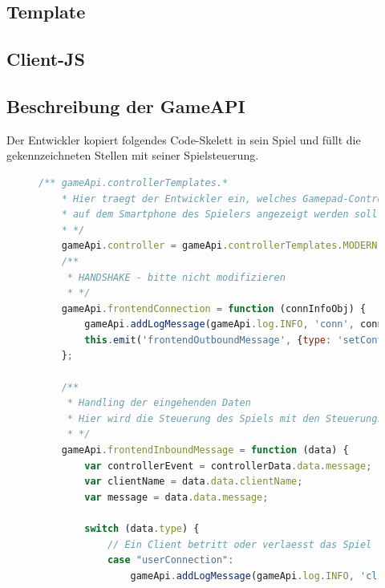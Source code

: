 \documentclass[a4paper]{spie}  %
\begin{document}
\subsection{Template} %
\subsection{Client-JS} %

\subsection{Beschreibung der GameAPI}
Der Entwickler kopiert folgendes Code-Skelett in sein Spiel und füllt die gekennzeichneten Stellen mit seiner Spielsteuerung.
\begin{figure}[h!]
	\centering
        \begin{lstlisting}[language=JavaScript,caption={Start der Applikation},label={lst:gameAPI}]
    /** gameApi.controllerTemplates.*
    * Hier traegt der Entwickler ein, welches Gamepad-Controller Layout
    * auf dem Smartphone des Spielers angezeigt werden soll
    * */
    gameApi.controller = gameApi.controllerTemplates.MODERN;
    /**
     * HANDSHAKE - bitte nicht modifizieren
     * */
    gameApi.frontendConnection = function (connInfoObj) {
        gameApi.addLogMessage(gameApi.log.INFO, 'conn', connInfoObj + " " + gameApi.socket.id);
        this.emit('frontendOutboundMessage', {type: 'setControllerTemplate', data: gameApi.controller});
    };

    /**
     * Handling der eingehenden Daten
     * Hier wird die Steuerung des Spiels mit den Steuerungsdaten vom Smartphone kombiniert
     * */
    gameApi.frontendInboundMessage = function (data) {
        var controllerEvent = controllerData.data.message;
        var clientName = data.data.clientName;
        var message = data.data.message;

        switch (data.type) {
            // Ein Client betritt oder verlaesst das Spiel
            case "userConnection":
                gameApi.addLogMessage(gameApi.log.INFO, 'client', 'Client ' + clientName + ' ' + message);


\end{lstlisting}
\end{figure}
\end{document}

